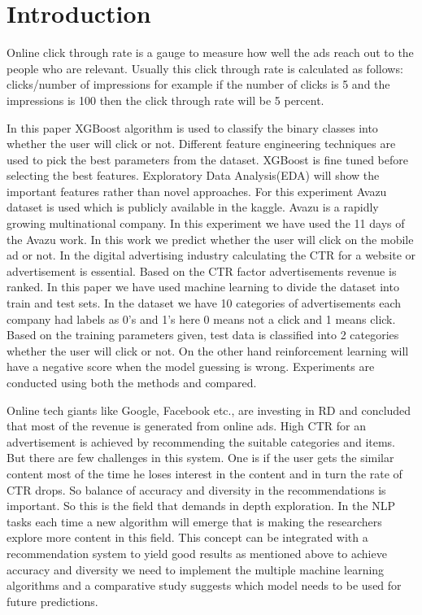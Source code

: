 \documentclass[conference]{IEEEtran}
\begin{document}
\section{Introduction}
Online click through rate is a gauge to measure how well the ads reach out to the people who are relevant. Usually this click through rate is calculated as follows: clicks/number of impressions for example if the number of clicks is 5 and the impressions is 100 then the click through rate will be 5 percent.

In this paper XGBoost algorithm is used to classify the binary classes into whether the user will click or not. Different feature engineering techniques are used to pick the best parameters from the dataset. XGBoost is fine tuned before selecting the best features. Exploratory Data Analysis(EDA) will show the important features rather than novel approaches. For this experiment Avazu dataset is used which is publicly available in the kaggle. Avazu is a rapidly growing multinational company. In this experiment we have used the 11 days of the Avazu work. In this work we predict whether the user will click on the mobile ad or not.
In the digital advertising industry calculating the CTR for a website or advertisement is essential. Based on the CTR factor advertisements revenue is ranked. In this paper we have used machine learning to divide the dataset into train and test sets. In the dataset we have 10 categories of advertisements each company had labels as 0’s and 1’s here 0 means not a click and 1 means click. Based on the training parameters given, test data  is classified into 2 categories whether the user will click or not. On the other hand reinforcement learning will have a negative score when the model guessing is wrong. Experiments are conducted using both the methods and compared.

Online tech giants like Google, Facebook etc., are investing in RD and concluded that most of the revenue is generated from online ads. High CTR for an advertisement is achieved by recommending the suitable categories and items. But there are few challenges in this system. One is if the user gets the similar content most of the time he loses interest in the content and in turn the rate of CTR drops. So balance of accuracy and diversity in the recommendations is important. So this is the field that demands in depth exploration. In the NLP tasks each time a new algorithm will emerge that is making the researchers explore more content in this field. This concept can be integrated with a recommendation system to yield good results as mentioned above to achieve accuracy and diversity we need to implement the multiple machine learning algorithms and a comparative study suggests which model needs to be used for future predictions.
\end{document}
